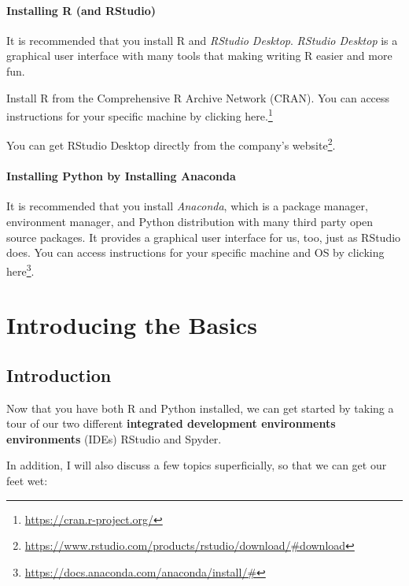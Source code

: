 \documentclass[
  12pt,
  krantz2]{krantz}
\renewcommand{\href}[2]{#2\footnote{\url{#1}}}
\begin{document}
\hypertarget{installing-r-and-rstudio}{%
\subsection*{Installing R (and RStudio)}\label{installing-r-and-rstudio}}


It is recommended that you install R and \emph{RStudio Desktop}. \emph{RStudio Desktop} is a graphical user interface with many tools that making writing R easier and more fun.

Install R from the Comprehensive R Archive Network (CRAN). You can access instructions for your specific machine by clicking \href{https://cran.r-project.org/}{here.}

You can get RStudio Desktop directly from the \href{https://www.rstudio.com/products/rstudio/download/\#download}{company's website}.

\hypertarget{installing-python-by-installing-anaconda}{%
\subsection*{Installing Python by Installing Anaconda}\label{installing-python-by-installing-anaconda}}


It is recommended that you install \emph{Anaconda}, which is a package manager, environment manager, and Python distribution with many third party open source packages. It provides a graphical user interface for us, too, just as RStudio does. You can access instructions for your specific machine and OS by clicking \href{https://docs.anaconda.com/anaconda/install/\#}{here}.

\mainmatter

\hypertarget{part-introducing-the-basics}{%
\part{Introducing the Basics}\label{part-introducing-the-basics}}

\hypertarget{intro}{%
\chapter{Introduction}\label{intro}}

Now that you have both R and Python installed, we can get started by taking a tour of our two different \textbf{integrated development environments environments} (IDEs) RStudio and Spyder.

In addition, I will also discuss a few topics superficially, so that we can get our feet wet:
\end{document}
